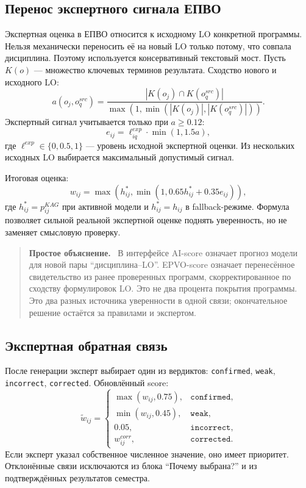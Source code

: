 \documentclass[twoside,11pt]{article}
\newenvironment{plainbox}{%
  \begin{quote}\small\noindent\textbf{Простое объяснение.}\ }{%
  \end{quote}}
\begin{document}
\subsection{Перенос экспертного сигнала ЕПВО}

Экспертная оценка в ЕПВО относится к исходному LO конкретной программы. Нельзя механически переносить её на новый LO только потому, что совпала дисциплина. Поэтому используется консервативный текстовый мост. Пусть $K(o)$ --- множество ключевых терминов результата. Сходство нового и исходного LO:
\begin{equation}
  a(o_j,o_q^{src})=
  \frac{|K(o_j)\cap K(o_q^{src})|}
       {\max\left(1,\min(|K(o_j)|,|K(o_q^{src})|)\right)}.
  \label{eq:expert-overlap}
\end{equation}
Экспертный сигнал учитывается только при $a\ge0.12$:
\begin{equation}
  e_{ij}=
  \ell_{iq}^{exp}\cdot
  \min(1,1.5a),
  \label{eq:expert-transfer}
\end{equation}
где $\ell^{exp}\in\{0,0.5,1\}$ --- уровень исходной экспертной оценки. Из нескольких исходных LO выбирается максимальный допустимый сигнал.

Итоговая оценка:
\begin{equation}
  w_{ij}=
  \max\left(
    h_{ij}^{\ast},
    \min(1,0.65h_{ij}^{\ast}+0.35e_{ij})
  \right),
  \label{eq:expert-blend}
\end{equation}
где $h_{ij}^{\ast}=p_{ij}^{KAG}$ при активной модели и $h_{ij}^{\ast}=h_{ij}$ в fallback-режиме. Формула позволяет сильной реальной экспертной оценке поднять уверенность, но не заменяет смысловую проверку.

\begin{plainbox}
В интерфейсе AI-score означает прогноз модели для новой пары
``дисциплина--LO''. EPVO-score означает перенесённое свидетельство из ранее
проверенных программ, скорректированное по сходству формулировок LO. Это не два
процента покрытия программы. Это два разных источника уверенности в одной
связи; окончательное решение остаётся за правилами и экспертом.
\end{plainbox}

\subsection{Экспертная обратная связь}

После генерации эксперт выбирает один из вердиктов: \texttt{confirmed}, \texttt{weak}, \texttt{incorrect}, \texttt{corrected}. Обновлённый score:
\begin{equation}
\tilde w_{ij}=
\begin{cases}
\max(w_{ij},0.75), & \texttt{confirmed},\\
\min(w_{ij},0.45), & \texttt{weak},\\
0.05, & \texttt{incorrect},\\
w_{ij}^{corr}, & \texttt{corrected}.
\end{cases}
\label{eq:feedback}
\end{equation}
Если эксперт указал собственное численное значение, оно имеет приоритет. Отклонённые связи исключаются из блока ``Почему выбрана?'' и из подтверждённых результатов семестра.
\end{document}

